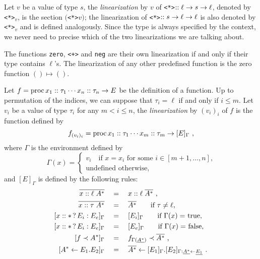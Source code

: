 \begin{definition}
  Let $v$ be a value of type $s$, the \emph{linearization} by $v$ of
  \lstinline{<*>}$::\ell\rightarrow s\rightarrow\ell$, denoted by \lstinline{<*>}$_v$,
  is the section $($\lstinline{<*>}$v)$; the linearization of
  \lstinline{<*>}$::s\rightarrow\ell\rightarrow\ell$ is also denoted by
  \lstinline{<*>}$_v$ and is defined analogously. Since the type is
  always specified by the context, we never need to precise which of
  the two linearizations we are talking about.
  
  The functions \lstinline{zero}, \lstinline{<+>} and \lstinline{neg}
  are their own linearization if and only if their type contains
  $\ell$'s. The linearization of any other predefined function is the
  zero function $()\mapsto()$.
\end{definition}

\begin{definition}[Linearization]
  Let $f=\operatorname{proc} x_1::\tau_1\cdots x_n::\tau_n\rightarrow E$ be the definition
  of a \tAL{} function. Up to permutation of the indices, we can
  suppose that $\tau_i=\ell$ if and only if $i\le m$. Let $v_i$ be a
  value of type $\tau_i$ for any $m<i\le n$, the \emph{linearization}
  by $(v_i)_i$ of $f$ is the function defined by
  \begin{equation}
    f_{(v_i)_i} = \operatorname{proc} x_1::\tau_1\cdots x_m::\tau_m\rightarrow [E]_\Gamma
    \text{ ,}
  \end{equation}
  where $\Gamma$ is the environment defined by
  \begin{equation}
    \Gamma(x) =
    \begin{cases}
      v_i \quad\text{if $x=x_i$ for some $i\in[m+1,\ldots,n]$,}\\
      \text{undefined otherwise,}
    \end{cases}
  \end{equation}
  and $[E]_\Gamma$ is defined by the following rules:
  \begin{align}
    \overline{x::\ell\;A^\ast} &\quad=\quad x::\ell\;\overline{A^\ast} \text{ ,}\\
    \overline{x::\tau\;A^\ast} &\quad=\quad \overline{A^\ast}
    \qquad\text{if $\tau\ne\ell$,}\\
    \label{eq:linear-if}
    [x::*\,?\,E_i:E_e]_\Gamma &\quad=\quad 
    [E_i]_\Gamma \qquad\text{if $\Gamma(x)=$ true,}\\
    \label{eq:linear-else}
    [x::*\,?\,E_i:E_e]_\Gamma &\quad=\quad 
    [E_e]_\Gamma \qquad\text{if $\Gamma(x)=$ false,}\\
    \label{eq:linear-apply}
    [f \prec A^\ast]_\Gamma &\quad=\quad f_{\Gamma(\underline{A^\ast})} \prec  \overline{A^\ast} \text{ ,}\\
    \label{eq:linear-let}
    [A^\ast\leftarrow E_1.E_2]_\Gamma &\quad=\quad
    \overline{A^\ast}\leftarrow[E_1]_\Gamma.[E_2]_{\Gamma:\underline{A^\ast}\leftarrow\underline{E_1}}
    \text{ .}
  \end{align}
\end{definition}

